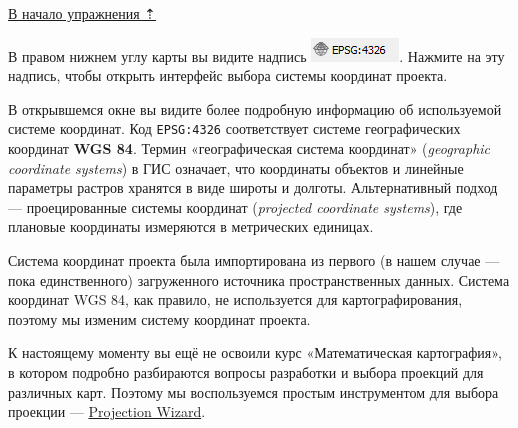\documentclass[
  12pt,
]{book}
\begin{document}
\protect\hyperlink{map-design-general}{В начало упражнения ⇡}

В правом нижнем углу карты вы видите надпись \includegraphics{images/Ex01/pic02.png}. Нажмите на эту надпись, чтобы открыть интерфейс выбора системы координат проекта.

В открывшемся окне вы видите более подробную информацию об используемой системе координат. Код \texttt{EPSG:4326} соответствует системе географических координат \textbf{WGS 84}. Термин «географическая система координат» (\emph{geographic coordinate systems}) в ГИС означает, что координаты объектов и линейные параметры растров хранятся в виде широты и долготы. Альтернативный подход --- проецированные системы координат (\emph{projected coordinate systems}), где плановые координаты измеряются в метрических единицах.

Система координат проекта была импортирована из первого (в нашем случае --- пока единственного) загруженного источника пространственных данных. Система координат WGS 84, как правило, не используется для картографирования, поэтому мы изменим систему координат проекта.

К настоящему моменту вы ещё не освоили курс «Математическая картография», в котором подробно разбираются вопросы разработки и выбора проекций для различных карт. Поэтому мы воспользуемся простым инструментом для выбора проекции --- \href{http://projectionwizard.org/}{Projection Wizard}.
\end{document}
